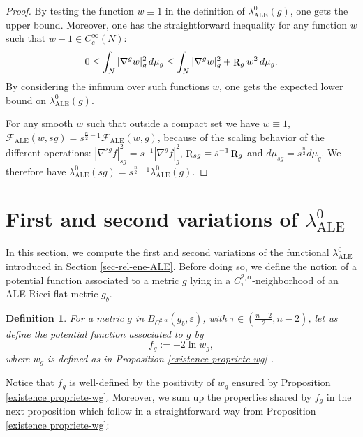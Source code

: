 \documentclass[a4paper,11pt,reqno]{amsart}
\newtheorem{defn}{Definition}[section]
\def\R{\mathop{\rm R}\nolimits}
\numberwithin{equation}{section}
\begin{document}
	\begin{proof}
		By testing the function $w\equiv1$ in the definition of $\lambda_{\operatorname{ALE}}^0(g)$, one gets the upper bound. Moreover, one has the straightforward inequality for any function $w$ such that $w-1\in C_c^{\infty}(N)$: $$0\leq \int_N|\nabla^g w|^2_g\,d\mu_g\leq \int_N|\nabla^g w|^2_g+\R_gw^2\,d\mu_g.$$ By considering the infimum over such functions $w$, one gets the expected lower bound on $\lambda_{\operatorname{ALE}}^0(g)$.
		
		For any smooth $w$ such that outside a compact set we have $w\equiv 1$,
		$\mathcal{F}_{\operatorname{ALE}}(w,sg) = s^{\frac{n}{2}- 1}\mathcal{F}_{\operatorname{ALE}}(w,g)$, because of the scaling behavior of the different operations: $|\nabla^{sg}f|_{sg}^2=s^{-1}|\nabla^{g}f|_{g}^2$, $\R_{sg}= s^{-1}\R_g$ and $d\mu_{sg} = s^{\frac{n}{2}}d\mu_g$.
		We therefore have $ \lambda_{\operatorname{ALE}}^0(sg) = s^{\frac{n}{2}- 1}\lambda_{\operatorname{ALE}}^0(g)$.
		
	\end{proof}
	
	
	\section{First and second variations of $\lambda_{\operatorname{ALE}}^0$}\label{sec-first-sec-var}
	In this section, we compute the first and second variations of the functional $\lambda_{\operatorname{ALE}}^0$ introduced in Section \ref{sec-rel-ene-ALE}. Before doing so, we define the notion of a potential function associated to a metric $g$ lying in a $C^{2,\alpha}_{\tau}$-neighborhood of an ALE Ricci-flat metric $g_b$.
	\begin{defn}
		For a metric $g$ in $B_{C^{2,\alpha}_{\tau}}(g_b,\varepsilon)$, with $\tau\in(\frac{n-2}{2},n-2)$, let us define the potential function associated to $g$ by $$f_g:=-2\ln w_g,$$
		where $w_g$ is defined as in Proposition \ref{existence propriete-wg} .
	\end{defn}
	Notice that $f_g$ is well-defined by the positivity of $w_g$ ensured by Proposition \ref{existence propriete-wg}. Moreover, we sum up the properties shared by $f_g$ in the next proposition which follow in a straightforward way from Proposition \ref{existence propriete-wg}:
	
\end{document}
